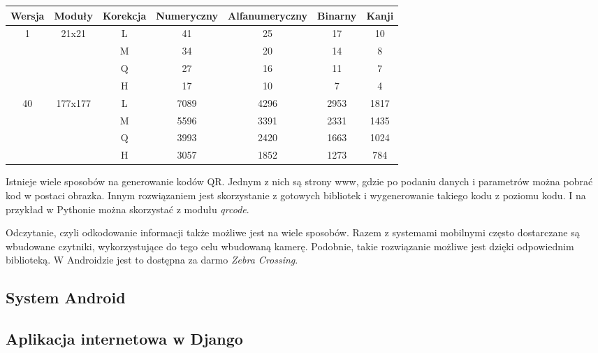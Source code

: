 \begin{center}
	\begin{tabular}{| c | c | c | c | c | c | c |}
		\hline
		Wersja & Moduły & Korekcja & Numeryczny & Alfanumeryczny & Binarny & Kanji\\
		\hline
		\multirow{4}{*}{1} & \multirow{4}{*}{21x21}&L&41&25&17&10\\
		& & M&34&20&14&8\\
		& & Q&27&16&11&7\\
		& & H&17&10&7&4\\
		\hline
		\multirow{4}{*}{40} & \multirow{4}{*}{177x177}&L&7089&4296&2953&1817\\
		& & M&5596&3391&2331&1435\\
		& & Q&3993&2420&1663&1024\\
		& & H&3057&1852&1273&784\\
		\hline
	\end{tabular}
\end{center} 
Istnieje wiele sposobów na generowanie kodów QR. Jednym z nich są strony www, gdzie po podaniu danych i parametrów można pobrać kod w postaci obrazka. Innym rozwiązaniem jest skorzystanie z gotowych bibliotek i wygenerowanie takiego kodu z poziomu kodu. I na przykład w Pythonie można skorzystać z modułu \textit{qrcode}.

Odczytanie, czyli odkodowanie informacji także możliwe jest na wiele sposobów. Razem z systemami mobilnymi często dostarczane są wbudowane czytniki, wykorzystujące do tego celu wbudowaną kamerę. Podobnie, takie rozwiązanie możliwe jest dzięki odpowiednim biblioteką. W Androidzie jest to dostępna za darmo \textit{Zebra Crossing}.


\subsection{System Android}
\subsection{Aplikacja internetowa w Django}
